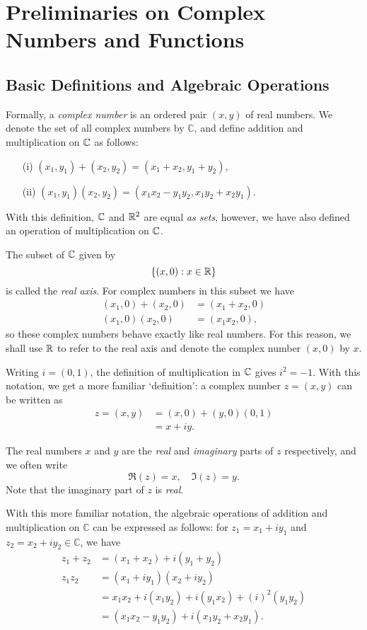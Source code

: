 
\chapter[Complex Numbers and Functions]{Preliminaries on Complex Numbers and Functions}

\section{Basic Definitions and Algebraic Operations}

Formally, a \emph{complex number} is an ordered pair $(x,y)$ of real numbers.  We denote the set of all complex numbers by $\mathbb{C}$, and define addition and multiplication on $\mathbb{C}$ as follows:
\begin{enumerate}
\item[(i)] $(x_1,y_1)+(x_2,y_2) = (x_1+x_2,y_1+y_2)$,
\item[(ii)] $(x_1,y_1)(x_2,y_2) = (x_1x_2-y_1y_2,x_1y_2+x_2y_1)$.
\end{enumerate}
With this definition, $\mathbb{C}$ and $\mathbb{R}^2$ are equal \emph{as sets}, however, we have also defined an operation of multiplication on $\mathbb{C}$.


The subset of $\mathbb{C}$ given by 
\[
\left\{(x,0): x \in \mathbb{R} \right\} 
\]
is called the \emph{real axis}.  For complex numbers in this subset we have
\begin{align*}
(x_1,0)+(x_2,0) & = (x_1+x_2,0) \\
(x_1,0)(x_2,0) &= (x_1x_2,0), 
\end{align*}
so these complex numbers behave exactly like real numbers.  For this reason, we shall use $\mathbb{R}$ to refer to the real axis and denote the complex number $(x,0)$ by $x$.



Writing $i=(0,1)$, the definition of multiplication in $\mathbb{C}$ gives $i^2=-1$. With this notation, we get a more familiar `definition': a complex number $z=(x,y)$ can be written as
\begin{align*}
z = (x,y) &= (x,0)+(y,0)(0,1) \\
& = x + iy.
\end{align*}


The real numbers $x$ and $y$ are the \emph{real} and \emph{imaginary} parts of $z$ respectively, and we often write
\[
\Re (z) = x,\quad \Im (z)=y.
\]
Note that the imaginary part of $z$ is \emph{real}.   

With this more familiar notation, the algebraic operations of addition and multiplication on $\mathbb{C}$ can be expressed as follows: for $z_1=x_1+iy_1$ and $z_2=x_2+iy_2 \in \mathbb{C}$, we have
\begin{align*}
z_1 +z_2  &= (x_1+x_2) + i (y_1+y_2) \\
z_1z_2 & = (x_1+iy_1)(x_2+iy_2) \\
& = x_1x_2 + i (x_1y_2) + i (y_1x_2) + (i)^2(y_1y_2) \\
& = (x_1x_2-y_1y_2) + i (x_1y_2+x_2y_1).
\end{align*}


